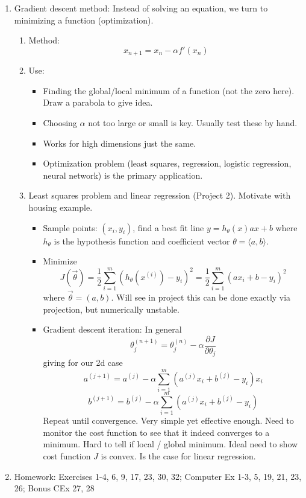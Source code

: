 \documentclass{article}
\theoremstyle{remark}
\begin{document}
\begin{enumerate}
\item Gradient descent method: Instead of solving an equation, we turn to minimizing a function (optimization). 
\begin{enumerate}
\item Method:
$$
x_{n+1} = x_n - \alpha f'(x_n)
$$
\item Use:
\begin{itemize}
\item Finding the global/local minimum of a function (not the zero here). Draw a parabola to give idea.
\item Choosing $\alpha$ not too large or small is key. Usually test these by hand.
\item Works for high dimensions just the same. 
\item Optimization problem (least squares, regression, logistic regression, neural network) is the primary application.
\end{itemize}
\item Least squares problem and linear regression (Project 2). Motivate with housing example.
\begin{itemize}
\item Sample points: $(x_i,y_i)$, find a best fit line $y=h_{\theta}(x) ax + b$ where $h_{\theta}$ is the hypothesis function and coefficient vector $\theta = \langle a,b \rangle$.
\item Minimize 
$$
J(\vec{\theta}) = \frac{1}{2}\sum_{i = 1}^m(h_{\theta}(x^{(i)})-y_i)^2
= \frac{1}{2}\sum_{i = 1}^m(ax_i+b-y_i)^2
$$
where $\vec{\theta}=(a,b)$. Will see in project this can be done exactly via projection, but numerically unstable.
\item Gradient descent iteration: In general
\[
\theta_{j}^{(n+1)} = \theta_{j}^{(n)} - \alpha \frac{\partial J}{\partial \theta_j}
\]
giving for our 2d case
$$
a^{(j+1)} = a^{(j)} - \alpha \sum_{i = 1}^m(a^{(j)}x_i+b^{(j)}-y_i)x_i
$$
$$
b^{(j+1)} = b^{(j)} - \alpha \sum_{i = 1}^m(a^{(j)}x_i+b^{(j)}-y_i)
$$
Repeat until convergence. Very simple yet effective enough. Need to monitor the cost function to see that it indeed converges to a minimum. Hard to tell if local / global minimum. Ideal need to show cost function $J$ is convex. Is the case for linear regression.
\end{itemize}
\end{enumerate}

\item Homework:  Exercises 1-4, 6, 9, 17, 23, 30, 32; Computer Ex 1-3, 5, 19, 21, 23, 26; Bonus CEx 27, 28

\end{enumerate}
\end{document}
